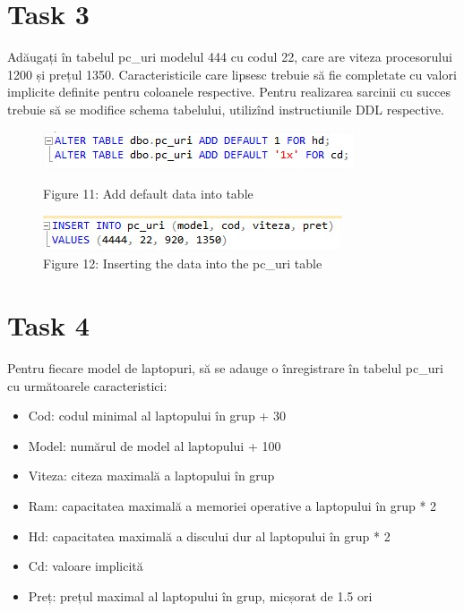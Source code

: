 \section{Task 3}

Adăugați în tabelul pc\_uri modelul 444 cu codul 22, care are viteza procesorului 1200 și prețul 1350. Caracteristicile care lipsesc trebuie să fie completate cu valori implicite definite pentru coloanele respective. Pentru realizarea sarcinii cu succes trebuie să se modifice schema tabelului, utilizînd instructiunile DDL respective.

\begin{figure}[H]
	\centering
		\includegraphics[width=\linewidth]{screens/13.jpg}
		\caption*{Figure 11: Add default data into table}
		\label{}
	\endminipage\hfill
		\includegraphics[width=\linewidth]{screens/14.jpg}
		\caption*{Figure 12: Inserting the data into the pc\_uri table}
	\endminipage
\end{figure}

\section{Task 4}
Pentru fiecare model de laptopuri, să se adauge o înregistrare în tabelul pc\_uri cu următoarele caracteristici: 
\begin{itemize}
	\item Cod: codul minimal al laptopului în grup + 30
	\item Model: numărul de model al laptopului + 100
	\item Viteza: citeza maximală a laptopului în grup
	\item Ram: capacitatea maximală a memoriei operative a laptopului în grup * 2
	\item Hd: capacitatea maximală a discului dur al laptopului în grup * 2
	\item Cd: valoare implicită
	\item Preț: prețul maximal al laptopului în grup, micșorat de 1.5 ori
\end{itemize}
	
